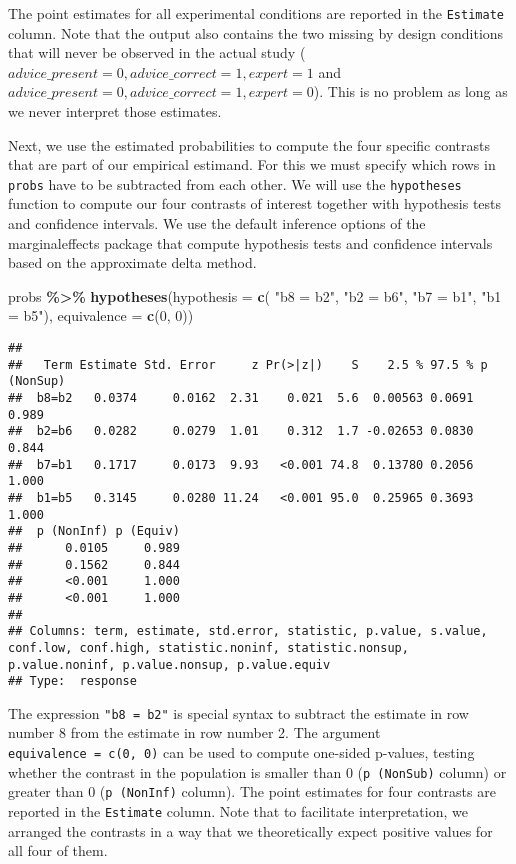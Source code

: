 \documentclass[
  man,floatsintext]{apa6}
\newenvironment{Shaded}{\begin{snugshade}}{\end{snugshade}}
\newcommand{\AttributeTok}[1]{\textcolor[rgb]{0.13,0.29,0.53}{#1}}
\newcommand{\DecValTok}[1]{\textcolor[rgb]{0.00,0.00,0.81}{#1}}
\newcommand{\FunctionTok}[1]{\textcolor[rgb]{0.13,0.29,0.53}{\textbf{#1}}}
\newcommand{\NormalTok}[1]{#1}
\newcommand{\SpecialCharTok}[1]{\textcolor[rgb]{0.81,0.36,0.00}{\textbf{#1}}}
\newcommand{\StringTok}[1]{\textcolor[rgb]{0.31,0.60,0.02}{#1}}
\begin{document}
The point estimates for all experimental conditions are reported in the \texttt{Estimate} column.
Note that the output also contains the two missing by design conditions that will never be observed in the actual study (\(advice\_present = 0, advice\_correct = 1, expert = 1\) and \(advice\_present = 0, advice\_correct = 1, expert = 0\)).
This is no problem as long as we never interpret those estimates.

Next, we use the estimated probabilities to compute the four specific contrasts that are part of our empirical estimand.
For this we must specify which rows in \texttt{probs} have to be subtracted from each other.
We will use the \texttt{hypotheses} function to compute our four contrasts of interest together with hypothesis tests and confidence intervals.
We use the default inference options of the marginaleffects package that compute hypothesis tests and confidence intervals based on the approximate delta method.

\begin{Shaded}
\begin{Highlighting}[]
\NormalTok{probs }\SpecialCharTok{\%\textgreater{}\%} 
  \FunctionTok{hypotheses}\NormalTok{(}\AttributeTok{hypothesis =} \FunctionTok{c}\NormalTok{(}
    \StringTok{"b8 = b2"}\NormalTok{,}
    \StringTok{"b2 = b6"}\NormalTok{,}
    \StringTok{"b7 = b1"}\NormalTok{,}
    \StringTok{"b1 = b5"}\NormalTok{),}
    \AttributeTok{equivalence =} \FunctionTok{c}\NormalTok{(}\DecValTok{0}\NormalTok{, }\DecValTok{0}\NormalTok{))}
\end{Highlighting}
\end{Shaded}

\begin{verbatim}
## 
##   Term Estimate Std. Error     z Pr(>|z|)    S    2.5 % 97.5 % p (NonSup)
##  b8=b2   0.0374     0.0162  2.31    0.021  5.6  0.00563 0.0691      0.989
##  b2=b6   0.0282     0.0279  1.01    0.312  1.7 -0.02653 0.0830      0.844
##  b7=b1   0.1717     0.0173  9.93   <0.001 74.8  0.13780 0.2056      1.000
##  b1=b5   0.3145     0.0280 11.24   <0.001 95.0  0.25965 0.3693      1.000
##  p (NonInf) p (Equiv)
##      0.0105     0.989
##      0.1562     0.844
##      <0.001     1.000
##      <0.001     1.000
## 
## Columns: term, estimate, std.error, statistic, p.value, s.value, conf.low, conf.high, statistic.noninf, statistic.nonsup, p.value.noninf, p.value.nonsup, p.value.equiv 
## Type:  response
\end{verbatim}

The expression \texttt{"b8\ =\ b2"} is special syntax to subtract the estimate in row number 8 from the estimate in row number 2.
The argument \texttt{equivalence\ =\ c(0,\ 0)} can be used to compute one-sided p-values, testing whether the contrast in the population is smaller than 0 (\texttt{p\ (NonSub)} column) or greater than 0 (\texttt{p\ (NonInf)} column).
The point estimates for four contrasts are reported in the \texttt{Estimate} column.
Note that to facilitate interpretation, we arranged the contrasts in a way that we theoretically expect positive values for all four of them.
\end{document}
